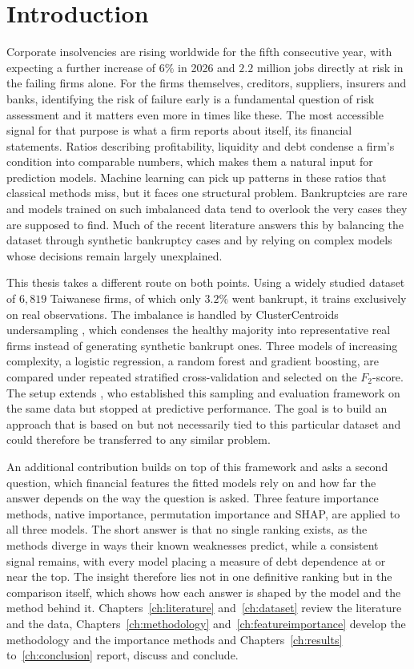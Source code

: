 \chapter{Introduction}
\label{ch:introduction}

Corporate insolvencies are rising worldwide for the fifth consecutive year, with
\textcite{allianztrade2026} expecting a further increase of $6\%$ in 2026 and
$2.2$ million jobs directly at risk in the failing firms alone. For the firms themselves, creditors,
suppliers, insurers and banks, identifying the risk of failure early is a
fundamental question of risk assessment and it matters even more in times like
these. The most accessible signal for that purpose is what a firm reports about
itself, its financial statements. Ratios describing profitability, liquidity
and debt condense a firm's condition into comparable numbers, which makes them
a natural input for prediction models. Machine learning can pick up patterns in
these ratios that classical methods miss, but it faces one structural problem.
Bankruptcies are rare and models trained on such imbalanced data tend to
overlook the very cases they are supposed to find. Much of the recent
literature answers this by balancing the dataset through synthetic bankruptcy 
cases and by relying on complex models whose decisions remain largely unexplained.

This thesis takes a different route on both points. Using a widely studied
dataset of $6{,}819$ Taiwanese firms, of which only $3.2\%$ went bankrupt, it
trains exclusively on real observations. The imbalance is handled by
ClusterCentroids undersampling \parencite{islp2023}, which condenses the healthy majority into
representative real firms instead of generating synthetic bankrupt ones. Three
models of increasing complexity, a logistic regression, a random forest and
gradient boosting, are compared under repeated stratified cross-validation and
selected on the $F_2$-score. The setup extends \textcite{wangliu2021}, who established this
sampling and evaluation framework on the same data but stopped at predictive
performance. %
 The goal is to build an approach that is based on but not necessarily 
tied to this particular dataset and could therefore be transferred to any similar problem.

An additional contribution builds on top of this framework and asks a second
question, which financial features the fitted models rely on and how far the
answer depends on the way the question is asked. Three feature importance methods, native importance, 
permutation importance and SHAP, are applied to all three models. The short 
answer is that no single ranking exists, as the methods
diverge in ways their known weaknesses predict, while a consistent signal
remains, with every model placing a measure of debt dependence at or near the
top. The insight therefore lies not in one definitive ranking but in the comparison
itself, which shows how each answer is shaped by the model and the method
behind it. Chapters~\ref{ch:literature} and~\ref{ch:dataset} review the literature and the data, Chapters~\ref{ch:methodology} and~\ref{ch:featureimportance}
develop the methodology and the importance methods and Chapters~\ref{ch:results} to~\ref{ch:conclusion} report,
discuss and conclude. %